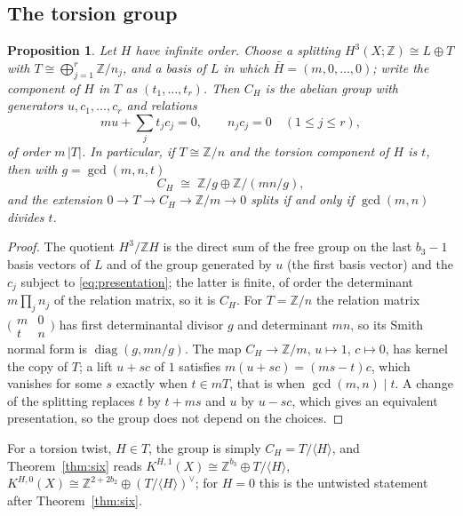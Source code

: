 \documentclass[reqno,11pt]{amsart}
\newtheorem{proposition}[theorem]{Proposition}
\theoremstyle{definition}
\newcommand{\ZZ}{\mathbb{Z}}
\begin{document}
\subsection{The torsion group}
\begin{proposition}\label{prop:presentation}
Let $H$ have infinite order. Choose a splitting $H^3(X;\ZZ)\cong L\oplus T$ with $T\cong\bigoplus_{j=1}^r\ZZ/n_j$, and a basis of $L$ in which $\bar H=(m,0,\dots,0)$; write the component of $H$ in $T$ as $(t_1,\dots,t_r)$. Then $C_H$ is the abelian group with generators $u,c_1,\dots,c_r$ and relations
\begin{equation}\label{eq:presentation}
mu+\textstyle\sum_jt_jc_j=0,\qquad n_jc_j=0\quad(1\le j\le r),
\end{equation}
of order $m\,|T|$. In particular, if $T\cong\ZZ/n$ and the torsion component of $H$ is $t$, then with $g=\gcd(m,n,t)$
\[
C_H\;\cong\;\ZZ/g\oplus\ZZ/(mn/g),
\]
and the extension $0\to T\to C_H\to\ZZ/m\to0$ splits if and only if $\gcd(m,n)$ divides $t$.
\end{proposition}

\begin{proof}
The quotient $H^3/\ZZ H$ is the direct sum of the free group on the last $b_3-1$ basis vectors of $L$ and of the group generated by $u$ (the first basis vector) and the $c_j$ subject to \eqref{eq:presentation}; the latter is finite, of order the determinant $m\prod_jn_j$ of the relation matrix, so it is $C_H$. For $T=\ZZ/n$ the relation matrix $\bigl(\begin{smallmatrix}m&0\\t&n\end{smallmatrix}\bigr)$ has first determinantal divisor $g$ and determinant $mn$, so its Smith normal form is $\operatorname{diag}(g,mn/g)$. The map $C_H\to\ZZ/m$, $u\mapsto1$, $c\mapsto0$, has kernel the copy of $T$; a lift $u+sc$ of $1$ satisfies $m(u+sc)=(ms-t)c$, which vanishes for some $s$ exactly when $t\in mT$, that is when $\gcd(m,n)\mid t$. A change of the splitting replaces $t$ by $t+ms$ and $u$ by $u-sc$, which gives an equivalent presentation, so the group does not depend on the choices.
\end{proof}

For a torsion twist, $H\in T$, the group is simply $C_H=T/\langle H\rangle$, and Theorem~\ref{thm:six} reads $K^{H,1}(X)\cong\ZZ^{b_3}\oplus T/\langle H\rangle$, $K^{H,0}(X)\cong\ZZ^{2+2b_2}\oplus(T/\langle H\rangle)^\vee$; for $H=0$ this is the untwisted statement after Theorem~\ref{thm:six}.
\end{document}
